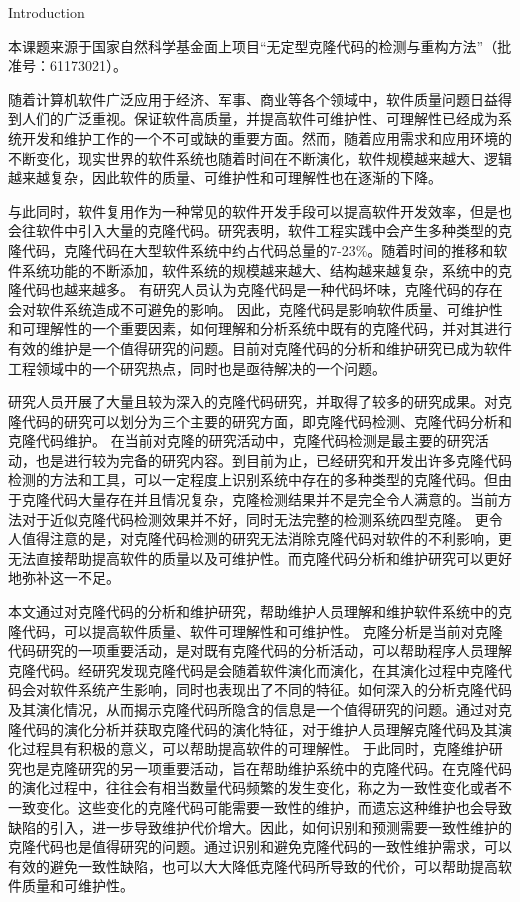 
{Introduction}


本课题来源于国家自然科学基金面上项目“无定型克隆代码的检测与重构方法”（批准号：61173021）。

随着计算机软件广泛应用于经济、军事、商业等各个领域中，软件质量问题日益得到人们的广泛重视。保证软件高质量，并提高软件可维护性、可理解性已经成为系统开发和维护工作的一个不可或缺的重要方面。然而，随着应用需求和应用环境的不断变化，现实世界的软件系统也随着时间在不断演化，软件规模越来越大、逻辑越来越复杂，因此软件的质量、可维护性和可理解性也在逐渐的下降。

与此同时，软件复用作为一种常见的软件开发手段可以提高软件开发效率，但是也会往软件中引入大量的克隆代码。研究表明，软件工程实践中会产生多种类型的克隆代码，克隆代码在大型软件系统中约占代码总量的7-23\%\cite{roy2007survey}。随着时间的推移和软件系统功能的不断添加，软件系统的规模越来越大、结构越来越复杂，系统中的克隆代码也越来越多。
有研究人员认为克隆代码是一种代码坏味\cite{fowler2009refactoring}，克隆代码的存在会对软件系统造成不可避免的影响。
因此，克隆代码是影响软件质量、可维护性和可理解性的一个重要因素，如何理解和分析系统中既有的克隆代码，并对其进行有效的维护是一个值得研究的问题。目前对克隆代码的分析和维护研究已成为软件工程领域中的一个研究热点，同时也是亟待解决的一个问题。

研究人员开展了大量且较为深入的克隆代码研究，并取得了较多的研究成果。对克隆代码的研究可以划分为三个主要的研究方面，即克隆代码检测、克隆代码分析和克隆代码维护。
在当前对克隆的研究活动中，克隆代码检测是最主要的研究活动，也是进行较为完备的研究内容。到目前为止，已经研究和开发出许多克隆代码检测的方法和工具，可以一定程度上识别系统中存在的多种类型的克隆代码。但由于克隆代码大量存在并且情况复杂，克隆检测结果并不是完全令人满意的。当前方法对于近似克隆代码检测效果并不好，同时无法完整的检测系统四型克隆。
更令人值得注意的是，对克隆代码检测的研究无法消除克隆代码对软件的不利影响，更无法直接帮助提高软件的质量以及可维护性。而克隆代码分析和维护研究可以更好地弥补这一不足。

本文通过对克隆代码的分析和维护研究，帮助维护人员理解和维护软件系统中的克隆代码，可以提高软件质量、软件可理解性和可维护性。
克隆分析是当前对克隆代码研究的一项重要活动，是对既有克隆代码的分析活动，可以帮助程序人员理解克隆代码。经研究发现克隆代码是会随着软件演化而演化，在其演化过程中克隆代码会对软件系统产生影响，同时也表现出了不同的特征。如何深入的分析克隆代码及其演化情况，从而揭示克隆代码所隐含的信息是一个值得研究的问题。通过对克隆代码的演化分析并获取克隆代码的演化特征，对于维护人员理解克隆代码及其演化过程具有积极的意义，可以帮助提高软件的可理解性。
于此同时，克隆维护研究也是克隆研究的另一项重要活动，旨在帮助维护系统中的克隆代码。在克隆代码的演化过程中，往往会有相当数量代码频繁的发生变化，称之为一致性变化或者不一致变化。这些变化的克隆代码可能需要一致性的维护，而遗忘这种维护也会导致缺陷的引入，进一步导致维护代价增大。因此，如何识别和预测需要一致性维护的克隆代码也是值得研究的问题。通过识别和避免克隆代码的一致性维护需求，可以有效的避免一致性缺陷，也可以大大降低克隆代码所导致的代价，可以帮助提高软件质量和可维护性。

